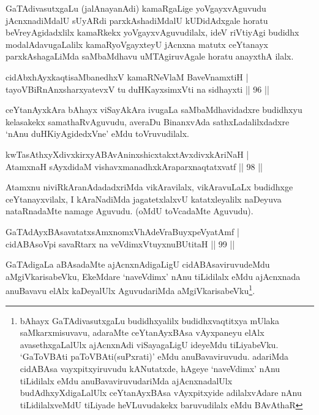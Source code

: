 \begin{artha}
GaTAdivasutxgaLu (jalAnayanAdi) kamaRgaLige yoVgayxvAguvudu jAcnxnadiMdalU sUyARdi parxkAshadiMdalU kUDidAdxgale horatu beVreyAgidadxlilx kamaRkekx yoVgayxvAguvudilalx, ideV riVtiyAgi budidhx modalAdavugaLalilx kamaRyoVgayxteyU jAcnxna matutx ceYtanayx parxkAshagaLiMda saMbaMdhavu uMTAgiruvAgale horatu anayxthA ilalx.
\end{artha}


\begin{shl}
cidAbxhAyxkaqtisaMbanedhxV kamaRNeV\s laM BaveVnamxtiH | \\
tayoVBiRnAnxsharxyatevxV tu duHKayxsimxVti na sidhayxti \hfill ||  96 ||  
\end{shl}

\begin{artha}
ceYtanAyxkAra bAhayx viSayAkAra ivugaLa saMbaMdhavidadxre budidhxyu kelasakekx samathaRvAguvudu, averaDu BinanxvAda sathxLadalilxdadxre `nAnu duHKiyAgidedxVne' eMdu toVruvudilalx.
\end{artha}


\begin{shl}
kwTasAthxyXdivxkirxyABAvAninxshicxtakxtAvxdivxkAriNaH | \\
AtamxnaH sAyxdidaM vishavxmanadhxkAraparxnaqtatxvatf \hfill||  98 ||  
\end{shl}

\begin{artha}
Atamxnu niviRkAranAdadadxriMda vikAravilalx, vikAravuLaLx budidhxge ceYtanayxvilalx, I kAraNadiMda jagatetxlalxvU katatxleyalilx naDeyuva nataRnadaMte namage Aguvudu. (oMdU toVcadaMte Aguvudu).
\end{artha}


\begin{shl}
GaTAdAyxBAsavatatxsAmxnomxVhAdeVraBuyxpeVyatAmf | \\
cidABAsoV\s pi savaRtarx na veVdimxVtuyxnuBUtitaH \hfill||  99 ||  
\end{shl}

\begin{artha}
GaTAdigaLa aBAsadaMte ajAcnxnAdigaLigU cidABAsaviruvudeMdu aMgiVkarisabeVku, EkeMdare `naveVdimx' nAnu tiLidilalx eMdu ajAcnxnada anuBavavu elAlx kaDeyalUlx AguvudariMda aMgiVkarisabeVku\footnote[1]{bAhayx GaTAdivasutxgaLu budidhxyalilx budidhxvaqtitxya mUlaka saMkarxmisuvavu, adaraMte ceYtanAyxBAsa vAyxpaneyu elAlx avasethxgaLalUlx ajAcnxnAdi viSayagaLigU ideyeMdu tiLiyabeVku. `GaToVBAti paToVBAti(suPxrati)' eMdu anuBavaviruvudu. adariMda cidABAsa vayxpitxyiruvudu kANutatxde, hAgeye `naveVdimx' nAnu tiLidilalx eMdu anuBavaviruvudariMda ajAcnxnadalUlx budAdhxyXdigaLalUlx ceYtanAyxBAsa vAyxpitxyide adilalxvAdare nAnu tiLidilalxveMdU tiLiyade heVLuvudakekx baruvudilalx eMdu BAvAthaR}.
\end{artha}

